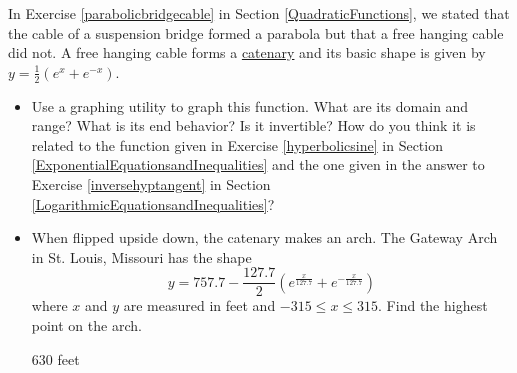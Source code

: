 \documentclass{ximera}
\begin{document}
\begin{problem}\label{catenary} 
 In Exercise \ref{parabolicbridgecable} in Section \ref{QuadraticFunctions}, we stated that the cable of a suspension bridge formed a parabola but that a free hanging cable did not.  A free hanging cable forms a \underline{catenary} and its basic shape is given by $y = \frac{1}{2}\left(e^{x} + e^{-x}\right)$.  

 \begin{itemize}
     \item 
     Use a graphing utility to graph this function.  What are its domain and range?  What is its end behavior?  Is it invertible?  How do you think it is related to the function given in Exercise \ref{hyperbolicsine} in Section \ref{ExponentialEquationsandInequalities} and the one given in the answer to Exercise \ref{inversehyptangent} in Section \ref{LogarithmicEquationsandInequalities}?  

 \item 
    When flipped upside down, the catenary makes an arch.  The Gateway Arch in St. Louis, Missouri has the shape \[y = 757.7 - \frac{127.7}{2}\left(e^{\frac{x}{127.7}} + e^{-\frac{x}{127.7}}\right)\] where $x$ and $y$ are measured in feet and $-315 \leq x \leq 315$.  Find the highest point on the arch.

\begin{solution}
630 feet
\end{solution}
\end{itemize}

\end{problem}
 
\end{document}
